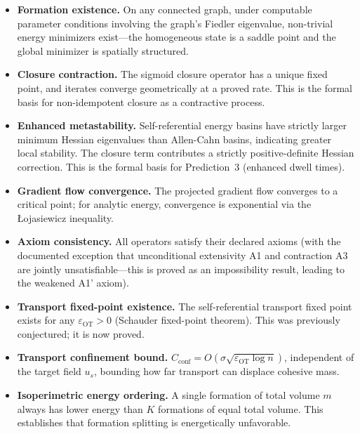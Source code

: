 \documentclass[lettersize,journal]{IEEEtran}
\begin{document}
\begin{itemize}
\item \textbf{Formation existence.} On any connected graph, under computable parameter conditions involving the graph's Fiedler eigenvalue, non-trivial energy minimizers exist---the homogeneous state is a saddle point and the global minimizer is spatially structured.

\item \textbf{Closure contraction.} The sigmoid closure operator has a unique fixed point, and iterates converge geometrically at a proved rate. This is the formal basis for non-idempotent closure as a contractive process.

\item \textbf{Enhanced metastability.} Self-referential energy basins have strictly larger minimum Hessian eigenvalues than Allen-Cahn basins, indicating greater local stability. The closure term contributes a strictly positive-definite Hessian correction. This is the formal basis for Prediction~3 (enhanced dwell times).

\item \textbf{Gradient flow convergence.} The projected gradient flow converges to a critical point; for analytic energy, convergence is exponential via the \L{}ojasiewicz inequality.

\item \textbf{Axiom consistency.} All operators satisfy their declared axioms (with the documented exception that unconditional extensivity A1 and contraction A3 are jointly unsatisfiable---this is proved as an impossibility result, leading to the weakened A1' axiom).

\item \textbf{Transport fixed-point existence.} The self-referential transport fixed point exists for any $\varepsilon_{\mathrm{OT}} > 0$ (Schauder fixed-point theorem). This was previously conjectured; it is now proved.

\item \textbf{Transport confinement bound.} $C_{\mathrm{conf}} = O(\sigma \sqrt{\varepsilon_{\mathrm{OT}} \log n})$, independent of the target field $u_s$, bounding how far transport can displace cohesive mass.

\item \textbf{Isoperimetric energy ordering.} A single formation of total volume $m$ always has lower energy than $K$ formations of equal total volume. This establishes that formation splitting is energetically unfavorable.


\end{itemize}
\end{document}
